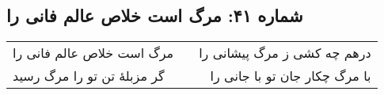 \begin{center}
\section*{شماره ۴۱: مرگ است خلاص عالم فانی را}
\label{sec:041}
\begin{longtable}{l p{0.5cm} r}
مرگ است خلاص عالم فانی را
&&
درهم چه کشی ز مرگ پیشانی را
\\
گر مزبلهٔ تن تو را مرگ رسید
&&
با مرگ چکار جان تو با جانی را
\\
\end{longtable}
\end{center}
